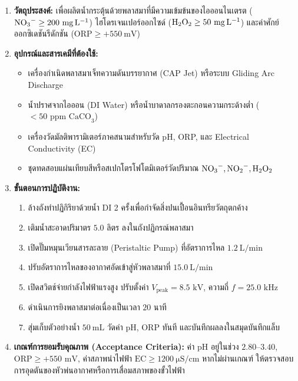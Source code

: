 \begin{enumerate}[leftmargin=2.0em, itemsep=6pt]
    \item \textbf{วัตถุประสงค์:} เพื่อผลิตน้ำกระตุ้นด้วยพลาสมาที่มีความเข้มข้นของไอออนไนเตรต ($\ce{NO3^-} \ge 200\ \si{\milli\gram\per\liter}$) ไฮโดรเจนเปอร์ออกไซด์ ($\ce{H2O2} \ge 50\ \si{\milli\gram\per\liter}$) และค่าศักย์ออกซิเดชันรีดักชัน ($\text{ORP} \ge +550\ \si{\milli\volt}$)
    \item \textbf{อุปกรณ์และสารเคมีที่ต้องใช้:}
    \begin{itemize}
        \item เครื่องกำเนิดพลาสมาเจ็ทความดันบรรยากาศ (CAP Jet) หรือระบบ Gliding Arc Discharge
        \item น้ำปราศจากไอออน (DI Water) หรือน้ำบาดาลกรองตะกอนความกระด้างต่ำ ($< 50\text{ ppm CaCO}_3$)
        \item เครื่องวัดมัลติพารามิเตอร์ภาคสนามสำหรับวัด pH, ORP, และ Electrical Conductivity (EC)
        \item ชุดทดสอบแผ่นเทียบสีหรือสเปกโตรโฟโตมิเตอร์วัดปริมาณ $\ce{NO3^-}, \ce{NO2^-}, \ce{H2O2}$
    \end{itemize}
    \item \textbf{ขั้นตอนการปฏิบัติงาน:}
    \begin{enumerate}[label=\arabic*., leftmargin=1.5em, itemsep=3pt]
        \item ล้างถังทำปฏิกิริยาด้วยน้ำ DI 2 ครั้งเพื่อกำจัดสิ่งปนเปื้อนอินทรียวัตถุตกค้าง
        \item เติมน้ำสะอาดปริมาตร $5.0\text{ ลิตร}$ ลงในถังปฏิกรณ์พลาสมา
        \item เปิดปั๊มหมุนเวียนสารละลาย (Peristaltic Pump) ที่อัตราการไหล $1.2\ \si{\liter\per\minute}$
        \item ปรับอัตราการไหลของอากาศอัดเข้าสู่หัวพลาสมาที่ $15.0\ \si{\liter\per\minute}$
        \item เปิดสวิตช์จ่ายกำลังไฟฟ้าแรงสูง ปรับตั้งค่า $V_{\text{peak}} = 8.5\text{ kV}$, ความถี่ $f = 25.0\text{ kHz}$
        \item ดำเนินการยิงพลาสมาต่อเนื่องเป็นเวลา $20\text{ นาที}$
        \item สุ่มเก็บตัวอย่างน้ำ $50\ \si{\milli\liter}$ วัดค่า pH, ORP ทันที และบันทึกผลลงในสมุดบันทึกแล็บ
    \end{enumerate}
    \item \textbf{เกณฑ์การยอมรับคุณภาพ (Acceptance Criteria):} ค่า $\text{pH}$ อยู่ในช่วง $2.80$--$3.40$, $\text{ORP} \ge +550\text{ mV}$, ค่าสภาพนำไฟฟ้า $\text{EC} \ge 1200\ \si{\micro\siemens\per\centi\meter}$ หากไม่ผ่านเกณฑ์ ให้ตรวจสอบการอุดตันของหัวพ่นอากาศหรือการเสื่อมสภาพของขั้วไฟฟ้า
\end{enumerate}

